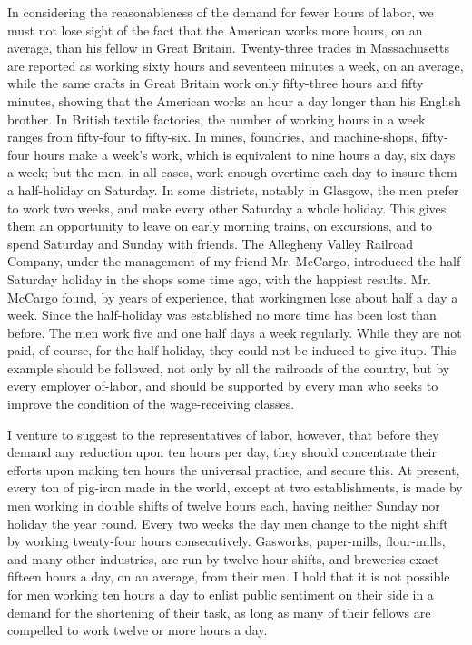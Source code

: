 \documentclass[11pt,openany]{book}
\begin{document}
In considering the reasonableness of the demand for fewer hours of labor, we must not lose sight of the fact that the American works more hours, on an average, than his fellow in Great Britain. Twenty-three trades in Massachusetts are reported as working sixty hours and seventeen minutes a week, on an average, while the same crafts in Great Britain work only fifty-three hours and fifty minutes, showing that the American works an hour a day longer than his English brother. In British textile factories, the number of working hours in a week ranges from fifty-four to fifty-six. In mines, foundries, and machine-shops, fifty-four hours make a week's work, which is equivalent to nine hours a day, six days a week; but the men, in all eases, work enough overtime each day to insure them a half-holiday on Saturday. In some districts, notably in Glasgow, the men prefer to work two weeks, and make every other Saturday a whole holiday. This gives them an opportunity to leave on early morning trains, on excursions, and to spend Saturday and Sunday with friends. The Allegheny Valley Railroad Company, under the management of my friend Mr. McCargo, introduced the half-Saturday holiday in the shops some time ago, with the happiest results. Mr. McCargo found, by years of experience, that workingmen lose about half a day a week. Since the half-holiday was established no more time has been lost than before. The men work five and one half days a week regularly. While they are not paid, of course, for the half-holiday, they could not be induced to give itup. This example should be followed, not only by all the railroads of the country, but by every employer of-labor, and should be supported by every man who seeks to improve the condition of the wage-receiving classes.

I venture to suggest to the representatives of labor, however, that before they demand any reduction upon ten hours per day, they should concentrate their efforts upon making ten hours the universal practice, and secure this. At present, every ton of pig-iron made in the world, except at two establishments, is made by men working in double shifts of twelve hours each, having neither Sunday nor holiday the year round. Every two weeks the day men change to the night shift by working twenty-four hours consecutively. Gasworks, paper-mills, flour-mills, and many other industries, are run by twelve-hour shifts, and breweries exact fifteen hours a day, on an average, from their men. I hold that it is not possible for men working ten hours a day to enlist public sentiment on their side in a demand for the shortening of their task, as long as many of their fellows are compelled to work twelve or more hours a day.
\end{document}
